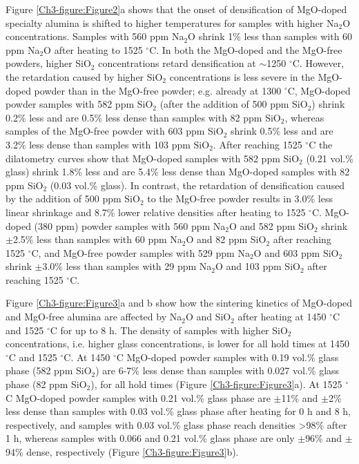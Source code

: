 Figure \ref{Ch3-figure:Figure2}a shows that the onset of densification of MgO-doped specialty alumina is shifted to higher temperatures for samples with higher Na$_{2}$O concentrations. Samples with 560 ppm Na$_{2}$O shrink 1\% less than samples with 60 ppm Na$_{2}$O after heating to 1525 $^{\circ}$C. In both the MgO-doped and the MgO-free powders, higher SiO$_{2}$ concentrations retard densification at $\sim$1250 $^{\circ}$C. However, the retardation caused by higher SiO$_{2}$ concentrations is less severe in the MgO-doped powder than in the MgO-free powder; e.g. already at 1300 $^{\circ}$C, MgO-doped powder samples with 582 ppm SiO$_{2}$ (after the addition of 500 ppm SiO$_{2}$) shrink 0.2\% less and are 0.5\% less dense than samples with 82 ppm SiO$_{2}$, whereas samples of the MgO-free powder with 603 ppm SiO$_{2}$ shrink 0.5\% less and are 3.2\% less dense than samples with 103 ppm SiO$_{2}$. After reaching 1525 $^{\circ}$C the dilatometry curves show that MgO-doped samples with 582 ppm SiO$_{2}$ (0.21 vol.\% glass) shrink 1.8\% less and are 5.4\% less dense than MgO-doped samples with 82 ppm SiO$_{2}$ (0.03 vol.\% glass). In contrast, the retardation of densification caused by the addition of 500 ppm SiO$_{2}$ to the MgO-free powder results in 3.0\% less linear shrinkage and 8.7\% lower relative densities after heating to 1525 $^{\circ}$C. MgO-doped (380 ppm) powder samples with 560 ppm Na$_{2}$O and 582 ppm SiO$_{2}$ shrink $\pm$2.5\% less than samples with 60 ppm Na$_{2}$O and 82 ppm SiO$_{2}$ after reaching 1525 $^{\circ}$C, and MgO-free powder samples with 529 ppm Na$_{2}$O and 603 ppm SiO$_{2}$ shrink $\pm$3.0\% less than samples with 29 ppm Na$_{2}$O and 103 ppm SiO$_{2}$ after reaching 1525 $^{\circ}$C.

Figure \ref{Ch3-figure:Figure3}a and b show how the sintering kinetics of MgO-doped and MgO-free \cite{Frueh2016} alumina are affected by Na$_{2}$O and SiO$_{2}$ after heating at 1450 $^{\circ}$C and 1525 $^{\circ}$C for up to 8 h. The density of samples with higher SiO$_{2}$ concentrations, i.e. higher glass concentrations, is lower for all hold times at 1450 $^{\circ}$C and 1525 $^{\circ}$C. At 1450 $^{\circ}$C MgO-doped powder samples with 0.19 vol.\% glass phase (582 ppm SiO$_{2}$) are 6-7\% less dense than samples with 0.027 vol.\% glass phase (82 ppm SiO$_{2}$), for all hold times (Figure \ref{Ch3-figure:Figure3}a). At 1525 $^{\circ}$C MgO-doped powder samples with 0.21 vol.\% glass phase are $\pm$11\% and $\pm$2\% less dense than samples with 0.03 vol.\% glass phase after heating for 0 h and 8 h, respectively, and samples with 0.03 vol.\% glass phase reach densities >98\% after 1 h, whereas samples with 0.066 and 0.21 vol.\% glass phase are only $\pm$96\% and $\pm$94\% dense, respectively (Figure \ref{Ch3-figure:Figure3}b). 

